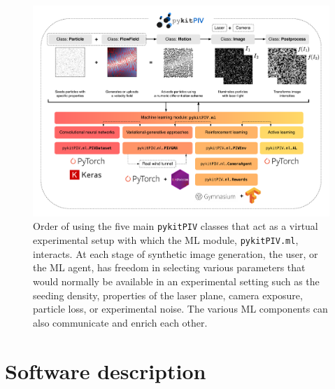 \documentclass[a4paper,fleqn]{cas-dc}
\begin{document}
\begin{figure}[t]
\centering
\vspace{-0.4 in}
\includegraphics[width=\textwidth]{pykitPIV-modules.pdf}
\vspace{10 pt}
\caption{\footnotesize Order of using the five main \texttt{pykitPIV} classes that act as a virtual experimental setup with which the ML module, \texttt{pykitPIV.ml}, interacts. At each stage of synthetic image generation, the user, or the ML agent, has freedom in selecting various parameters that would normally be available in an experimental setting such as the seeding density, properties of the laser plane, camera exposure, particle loss, or experimental noise. The various ML components can also communicate and enrich each other.}
\label{fig:pykitPIV-overview}
\end{figure}

\section{Software description} \label{sec:software}



\end{document}
